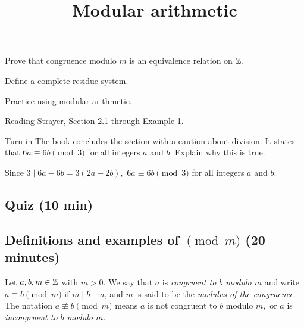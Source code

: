 \documentclass{../ximera}
\title{Modular arithmetic}
\begin{document}
\begin{abstract}
\end{abstract}
\maketitle

\begin{obj}
\item Prove that congruence modulo $m$ is an equivalence relation on $\mathbb Z$.
\item Define a complete residue system.
\item Practice using modular arithmetic.
\end{obj}

\begin{pre}
    \item[Reading] Strayer, Section 2.1 through Example 1.
    \item[Turn in] The book concludes the section with a caution about division. It states that $6a\equiv 6b \pmod 3$ for all integers $a$ and $b$. Explain why this is true.
    
    
    \begin{solution}
        Since $3\mid 6a-6b=3(2a-2b),$ $6a\equiv 6b \pmod 3$ for all integers $a$ and $b$.
    \end{solution}
    \end{pre}

\subsection{Quiz (10 min)}

\subsection{Definitions and examples of $\pmod m$ (20 minutes)}

\begin{defn}\label{defn:mod-divides} Let $a,b,m\in\mathbb Z$ with $m>0.$
We say that $a$ is \emph{congruent to $b$ modulo $m$} and write $a \equiv b \pmod{m}$ if $m\mid b-a$, and $m$ is said to be the \emph{modulus of the congruence}. The notation $a\not\equiv b\pmod m$ means $a$ is not congruent to $b$ modulo $m,$ or $a$ is \emph{incongruent to $b$ modulo $m$.} 
\end{defn}
\end{document}
